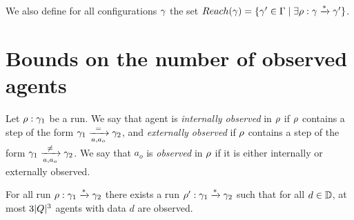 \documentclass[a4paper,UKenglish,cleveref, autoref, thm-restate]{lipics-v2021}
\begin{document}
	We also define for all configurations $\config$ the set $\Reach(\config) = \set{\config' \in \configset \mid \exists \run : \config \xrightarrow{*} \config'}$.

	\section{Bounds on the number of observed agents}
	
		\begin{definition}
		Let $\run : \config_1$ be a run.
		We say that agent is \emph{internally observed} in $\run$ if $\run$ contains a step of the form $\config_1 \step{=}{a}{a_o} \config_2$, and \emph{externally observed} if $\run$ contains a step of the form $\config_1 \step{\neq}{a}{a_o} \config_2$.
		We say that $a_o$ is \emph{observed} in $\run$ if it is either internally or externally observed.
	\end{definition}
	
	
	\begin{lemma}
		\label{lem:bound-observed-agent}
		For all run $\run : \config_1 \xrightarrow{*} \config_2$ there exists a run $\run' : \config_1 \xrightarrow{*} \config_2$ such that for all $d \in \Dataset$, at most $3\size{Q}^3$ agents with data $d$ are observed.
	\end{lemma}
	
\end{document}
